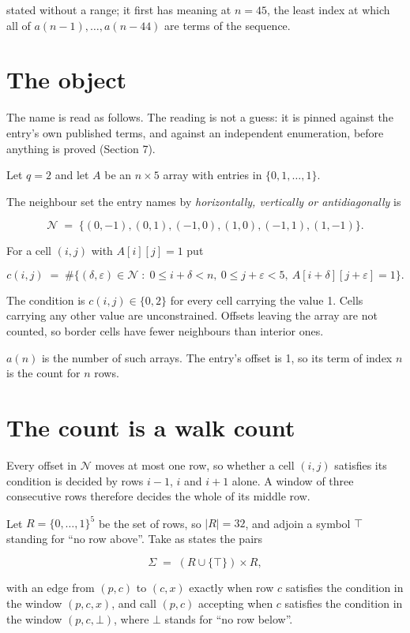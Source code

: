 \documentclass[11pt]{article}
\theoremstyle{definition}
\begin{document}
stated without a range; it first has meaning at $n = 45$, the least index at which all of $a(n-1),\dots,a(n-44)$ are terms of the sequence.

\section{The object}

The name is read as follows. The reading is not a guess: it is pinned against the entry's own published terms, and against an independent enumeration, before anything is proved (Section 7).

Let $q = 2$ and let $A$ be an $n \times 5$ array with entries in $\{0,1,\dots,1\}$.

The neighbour set the entry names by {\itshape horizontally, vertically or antidiagonally} is

\[\mathcal{N} \;=\; \{(0,-1), (0,1), (-1,0), (1,0), (-1,1), (1,-1)\}.\]

For a cell $(i,j)$ with $A[i][j] = 1$ put

\[c(i,j) \;=\; \#\bigl\{(\delta,\varepsilon)\in\mathcal{N} \;:\; 0\le i+\delta<n,\ 0\le j+\varepsilon<5,\ A[i+\delta][j+\varepsilon] = 1\bigr\}.\]

The condition is $c(i,j) \in \{0, 2\}$ for every cell carrying the value 1. Cells carrying any other value are unconstrained. Offsets leaving the array are not counted, so border cells have fewer neighbours than interior ones.

$a(n)$ is the number of such arrays. The entry's offset is 1, so its term of index $n$ is the count for $n$ rows.

\section{The count is a walk count}

Every offset in $\mathcal{N}$ moves at most one row, so whether a cell $(i,j)$ satisfies its condition is decided by rows $i-1$, $i$ and $i+1$ alone. A window of three consecutive rows therefore decides the whole of its middle row.

Let $R = \{0,\dots,1\}^{5}$ be the set of rows, so $|R| = 32$, and adjoin a symbol $\top$ standing for ``no row above''. Take as states the pairs

\[\Sigma \;=\; (R \cup \{\top\}) \times R,\]

with an edge from $(p,c)$ to $(c,x)$ exactly when row $c$ satisfies the condition in the window $(p,c,x)$, and call $(p,c)$ accepting when $c$ satisfies the condition in the window $(p,c,\bot)$, where $\bot$ stands for ``no row below''.
\end{document}
